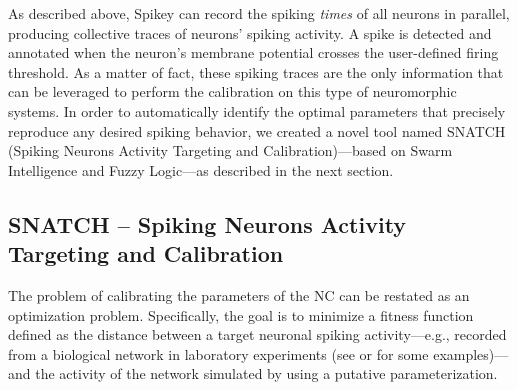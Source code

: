 \documentclass[utf8]{frontiersFPHY} %
\newcommand {\name}{SNATCH}
\begin{document}
As described above, Spikey can record the spiking \emph{times} of all neurons in parallel, producing collective traces of neurons' spiking activity.
A spike is detected and annotated when the neuron's membrane potential crosses the user-defined firing threshold. 
As a matter of fact, these spiking traces are the only information that can be leveraged to perform the calibration on this type of neuromorphic systems.
In order to automatically identify the optimal parameters that precisely reproduce any desired spiking behavior, we created a novel tool named \name{} (Spiking Neurons Activity Targeting and Calibration)---based on Swarm Intelligence and Fuzzy Logic---as described in the next section.


\subsection{SNATCH -- Spiking Neurons Activity Targeting and Calibration} 


The problem of calibrating the parameters of the NC can be restated as an optimization problem.
Specifically, the goal is to minimize a fitness function defined as the distance between a target neuronal spiking activity---e.g., recorded from a biological network in laboratory experiments (see \cite{} or \cite{} for some  examples)---and the activity of the network simulated by using a putative parameterization. 
\end{document}
